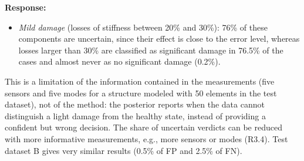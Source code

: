 \documentclass[11pt]{article}
\newenvironment{response}{\par\smallskip\noindent\color{resp}\textbf{Response:}\ }{\par}
\begin{document}
\begin{response}
\begin{itemize}[leftmargin=*]
	\item \emph{Mild damage} (losses of stiffness between 20\% and 30\%): 76\% of these components are uncertain, since their effect is close to the error level, whereas losses larger than 30\% are classified as significant damage in 76.5\% of the cases and almost never as no significant damage (0.2\%).
\end{itemize}
This is a limitation of the information contained in the measurements (five sensors and five modes for a structure modeled with 50 elements in the test dataset), not of the method: the posterior reports when the data cannot distinguish a light damage from the healthy state, instead of providing a confident but wrong decision.
The share of uncertain verdicts can be reduced with more informative measurements, e.g., more sensors or modes (R3.4).
Test dataset B gives very similar results (0.5\% of FP and 2.5\% of FN).


\end{response}
\end{document}
